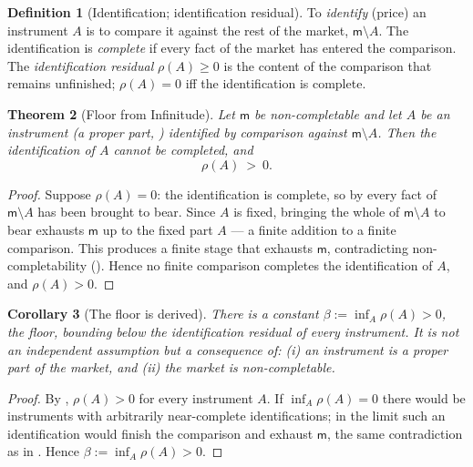 \documentclass[11pt,a4paper]{article}
\theoremstyle{thmstyle}
\newtheorem{theorem}{Theorem}[section]
\newtheorem{corollary}[theorem]{Corollary}
\theoremstyle{definition}
\newtheorem{definition}[theorem]{Definition}
\theoremstyle{remark}
\newcommand{\flo}{\beta}
\newcommand{\res}{\rho}
\newcommand{\medium}{\mathsf{m}}
\begin{document}
\begin{definition}[Identification; identification residual]
\label{def:identification}
To \emph{identify} (price) an instrument $A$ is to compare it against
the rest of the market, $\medium\setminus A$. The identification is
\emph{complete} if every fact of the market has entered the comparison.
The \emph{identification residual} $\res(A)\ge0$ is the content of the
comparison that remains unfinished; $\res(A)=0$ iff the identification
is complete.
\end{definition}

\begin{theorem}[Floor from Infinitude]
\label{thm:floor-infinitude}
Let $\medium$ be non-completable and let $A$ be an instrument (a proper
part, ) identified by comparison against
$\medium\setminus A$. Then the identification of $A$ cannot be
completed, and
\[
\boxed{\ \res(A)\ >\ 0.\ }
\]
\end{theorem}

\begin{proof}
Suppose $\res(A)=0$: the identification is complete, so by
 every fact of $\medium\setminus A$ has been
brought to bear. Since $A$ is fixed, bringing the whole of
$\medium\setminus A$ to bear exhausts $\medium$ up to the fixed part
$A$ --- a finite addition to a finite comparison. This produces a finite
stage that exhausts $\medium$, contradicting non-completability
(). Hence no finite comparison completes the
identification of $A$, and $\res(A)>0$.
\end{proof}

\begin{corollary}[The floor is derived]
\label{cor:floor-derived}
There is a constant $\flo:=\inf_A\res(A)>0$, the \emph{floor}, bounding
below the identification residual of every instrument. It is not an
independent assumption but a consequence of: (i) an instrument is a
proper part of the market, and (ii) the market is non-completable.
\end{corollary}

\begin{proof}
By , $\res(A)>0$ for every instrument $A$. If
$\inf_A\res(A)=0$ there would be instruments with arbitrarily
near-complete identifications; in the limit such an identification would
finish the comparison and exhaust $\medium$, the same contradiction as in
. Hence $\flo:=\inf_A\res(A)>0$.
\end{proof}
\end{document}
